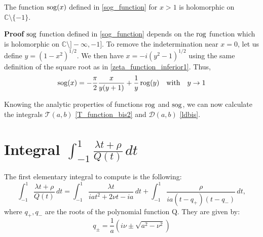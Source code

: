 \begin{lemma}
\label{lemma_sog}
The function ${\rm sog}(x)$ defined in \eqref{sog_function} for $x>1$ is holomorphic on $\mathbb{C}\setminus \{-1\}$.
\end{lemma}


{\bf Proof}
${\rm sog}$ function defined in \eqref{sog_function} depends on the $\rm rog$ function which is holomorphic on $\mathbb{C}\setminus \rbrack - \infty, -1 \rbrack$. To remove the indetermination near $x=0$, let us define $y=\left( 1-x^2 \right)^{1/2}$. We then have $x = -i \left( y^2 -1 \right)^{1/2} $ using the same definition of the square root as in \eqref{zeta_function_inferior1}. Thus,
\begin{equation}
{\rm sog}(x) = - \dfrac{\pi}{2} \dfrac{x}{y(y+1)} + \dfrac{1}{y} \, {\rm rog}(y) \quad \text{with} \quad y \rightarrow  1
\end{equation}

Knowing the analytic properties of functions $\rm rog$ and ${\rm sog}$, we can now calculate the integrals $\mathcal{T}(a,b)$ \eqref{T_function_bis2} and $\mathcal{D}(a,b)$ \eqref{ldbis}.

\section{Integral $\int_{-1}^1 \frac{\lambda t+ \rho}{Q(t)}\, dt$}
\label{calculIntQ}
The first elementary integral to compute is the following:
\begin{equation*}
\int_{-1}^1 \frac{\lambda t+ \rho}{Q(t)}\, dt=\int_{-1}^1 \frac{\lambda t}{iat^2+2\nu t-ia}\,dt+\int_{-1}^1\frac{\rho}{ia(t-q_+)(t-q_-)}\,dt,
\end{equation*}
where $q_+,q_-$ are the roots of the polynomial function Q. They are given by:
\begin{equation}
q_\pm=\frac{1}{a}(i\nu\pm\sqrt{a^2-\nu^2})
\label{q1q2}
\end{equation}

